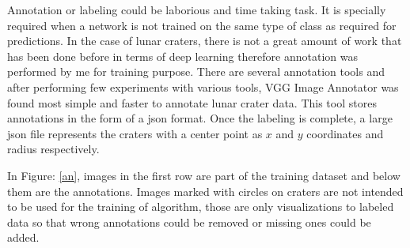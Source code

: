 \documentclass[11pt]{article}
\begin{document}
Annotation or labeling could be laborious and time taking task. It is specially required when a network is not trained on the same type of class as required for predictions. In the case of lunar craters, there is not a great amount of work that has been done before in terms of deep learning therefore annotation was performed by me for training purpose. There are several annotation tools and after performing few experiments with various tools, VGG Image Annotator was found most simple and faster to annotate lunar crater data. This tool stores annotations in the form of a json format. Once the labeling is complete, a large json file represents the craters with a center point as $x$ and $y$ coordinates and radius respectively.

In Figure: \ref{an}, images in the first row are part of the training dataset and below them are the annotations. Images marked with circles on craters are not intended to be used for the training of algorithm, those are only visualizations to labeled data so that wrong annotations could be removed or missing ones could be added.
\end{document}
